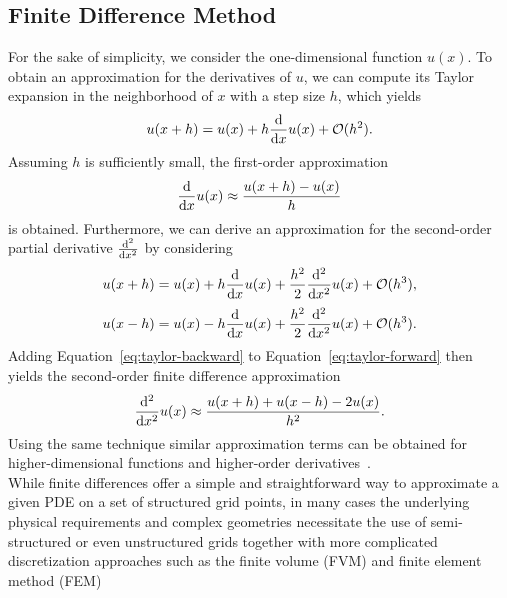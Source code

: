\subsection{Finite Difference Method}
For the sake of simplicity, we consider the one-dimensional function $u(x)$.
To obtain an approximation for the derivatives of $u$, we can compute its Taylor expansion in the neighborhood of $x$ with a step size $h$, which yields
\begin{equation}
	u(x + h) = u(x) + h \dv{x} u(x) + \mathcal{O}(h^2).
\end{equation}
Assuming $h$ is sufficiently small, the first-order approximation 
\begin{equation}
	\dv{x} u(x) \approx \frac{u(x + h) -  u(x)}{h}
\end{equation}
is obtained.
Furthermore, we can derive an approximation for the second-order partial derivative $\dv[2]{x}$ by considering
\begin{equation}
	u(x + h) = u(x) + h \dv{x} u(x) + \frac{h^2}{2} \dv[2]{x} u(x) + \mathcal{O}(h^3),
	\label{eq:taylor-forward}
\end{equation}
\begin{equation}
	u(x - h) = u(x) - h \dv{x} u(x) + \frac{h^2}{2} \dv[2]{x} u(x) + \mathcal{O}(h^3).
	\label{eq:taylor-backward}
\end{equation}
Adding Equation~\eqref{eq:taylor-backward} to Equation~\eqref{eq:taylor-forward} then yields the second-order finite difference approximation
\begin{equation}
	 \dv[2]{x} u(x) \approx \frac{u(x + h) + u(x - h) - 2u(x)}{h^2}.
\end{equation}
Using the same technique similar approximation terms can be obtained for higher-dimensional functions and higher-order derivatives~\cite{strikwerda2004finite}. \\
While finite differences offer a simple and straightforward way to approximate a given PDE on a set of structured grid points, in many cases the underlying physical requirements and complex geometries necessitate the use of semi-structured or even unstructured grids together with more complicated discretization approaches such as the finite volume (FVM) and finite element method (FEM)~\cite{versteeg2007introduction,zienkiewicz2005finite}
